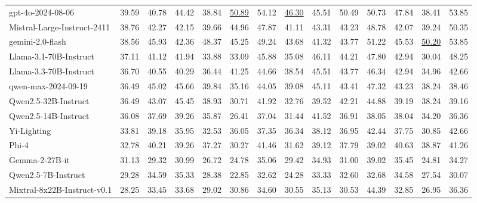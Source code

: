 {\begin{table}[p]
{\begin{tabular}{lccccccccccccc}
\rowcolor{color22}
gpt-4o-2024-08-06& 39.59& 40.78& 44.42& 38.84& \underline{50.89}& 54.12& \underline{46.30}& 45.51& 50.49& 50.73& 47.84& 38.41& 53.85 \\
\rowcolor{color22}
Mistral-Large-Instruct-2411& 38.76& 42.27& 42.15& 39.66& 44.96& 47.87& 41.11& 43.31& 43.23& 48.78& 42.07& 39.24& 50.35 \\
\rowcolor{color22}
gemini-2.0-flash& 38.56& 45.93& 42.36& 48.37& 45.25& 49.24& 43.68& 41.32& 43.77& 51.22& 45.53& \underline{50.20}& 53.85 \\
\rowcolor{color22}
Llama-3.1-70B-Instruct& 37.11& 41.12& 41.94& 33.88& 33.09& 45.88& 35.08& 46.11& 44.21& 47.80& 42.94& 30.04& 48.25 \\
\rowcolor{color22}
Llama-3.3-70B-Instruct& 36.70& 40.55& 40.29& 36.44& 41.25& 44.66& 38.54& 45.51& 43.77& 46.34& 42.94& 34.96& 42.66 \\
\rowcolor{color22}
qwen-max-2024-09-19& 36.49& 45.02& 45.66& 39.84& 35.16& 44.05& 39.08& 45.11& 43.41& 47.32& 43.23& 38.24& 38.46 \\
\rowcolor{color22}
Qwen2.5-32B-Instruct& 36.49& 43.07& 45.45& 38.93& 30.71& 41.92& 32.76& 39.52& 42.21& 44.88& 39.19& 38.24& 39.16 \\
\rowcolor{color22}
Qwen2.5-14B-Instruct& 36.08& 37.69& 39.26& 35.87& 26.41& 37.04& 31.44& 41.52& 36.91& 38.05& 38.04& 34.20& 36.36 \\
\rowcolor{color22}
Yi-Lighting& 33.81& 39.18& 35.95& 32.53& 36.05& 37.35& 36.34& 38.12& 36.95& 42.44& 37.75& 30.85& 42.66 \\
\rowcolor{color22}
Phi-4& 32.78& 40.21& 39.26& 37.27& 30.27& 41.46& 31.62& 39.12& 37.79& 39.02& 40.63& 38.87& 41.26 \\
\rowcolor{color22}
Gemma-2-27B-it& 31.13& 29.32& 30.99& 26.72& 24.78& 35.06& 29.42& 34.93& 31.00& 39.02& 35.45& 24.81& 34.27 \\
\rowcolor{color22}
Qwen2.5-7B-Instruct& 29.28& 34.59& 35.33& 28.38& 22.85& 32.62& 24.28& 33.33& 32.60& 32.68& 34.58& 27.54& 30.07 \\
\rowcolor{color22}
Mixtral-8x22B-Instruct-v0.1& 28.25& 33.45& 33.68& 29.02& 30.86& 34.60& 30.55& 35.13& 30.53& 44.39& 32.85& 26.95& 36.36 \\

\end{tabular}}
\end{table}}
